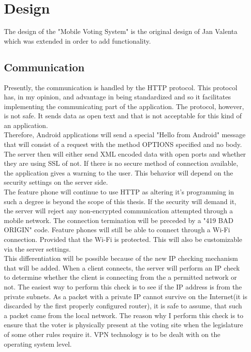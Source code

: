 \documentclass[11pt,twoside,a4paper]{book}
\begin{document}

\chapter{Design}
The design of the "Mobile Voting System" is the original design of Jan Valenta which was extended in order to add functionality.
\section{Communication}

Presently, the communication is handled by the HTTP protocol. This protocol has, in my opinion, and advantage in being standardized and so it facilitates implementing the communicating part of the application. The protocol, however, is not safe. It sends data as open text and that is not acceptable for this kind of an application.\\
 Therefore, Android applications will send a special "Hello from Android" message that will consist of a request with the method OPTIONS specified and no body. The server then will either send XML encoded data with open ports and whether they are using SSL of not. If there is no secure method of connection available, the application gives a warning to the user. This behavior will depend on the security settings on the server side. \\
  The feature phone will continue to use HTTP as altering it's programming in such a degree is beyond the scope of this thesis. If the security will demand it, the server will reject any non-encrypted communication attempted through a mobile network. The connection termination will be preceded by a "419 BAD ORIGIN" code. Feature phones will still be able to connect through a Wi-Fi connection. Provided that the Wi-Fi is protected. This will also be customizable via the server settings.\\
 
This differentiation will be possible because of the new IP checking mechanism that will be added. When a client connects, the server will perform an IP check to determine whether the client is connecting from the a permitted network or not. The easiest way to perform this check is to see if the IP address is from the private subnets. As a packet with a private IP cannot survive on the Internet(it is discarded by the first properly configured router), it is safe to assume, that such a packet came from the local network. The reason why I perform this check is to ensure that the voter is physically present at the voting site when the legislature of some other rules require it. VPN technology is to be dealt with on the operating system level.\\
\end{document}
